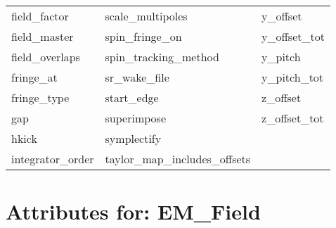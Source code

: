 \begin{tabular}{lll}
field_factor                & scale_multipoles            & y_offset                    \\
field_master                & spin_fringe_on              & y_offset_tot                \\
field_overlaps              & spin_tracking_method        & y_pitch                     \\
fringe_at                   & sr_wake_file                & y_pitch_tot                 \\
fringe_type                 & start_edge                  & z_offset                    \\
gap                         & superimpose                 & z_offset_tot                \\
hkick                       & symplectify                 &                             \\
integrator_order            & taylor_map_includes_offsets &                             \\
 \bottomrule
 \end{tabular}
 \vfill
 
 \section{Attributes for: EM_Field}
 \label{s:list.em.field}
 
